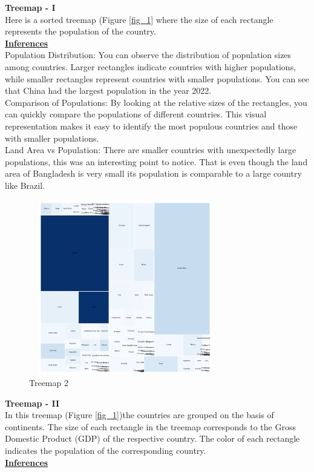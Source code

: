 \documentclass[conference]{IEEEtran}
\begin{document}
\textbf{Treemap - I}\\
Here is a sorted treemap (Figure \ref{fig_1} where the size of each rectangle represents the population of the country.\\
\underline{\textbf{Inferences}}\\
Population Distribution: You can observe the distribution of population sizes among countries. Larger rectangles indicate countries with higher populations, while smaller rectangles represent countries with smaller populations. You can see that China had the largest population in the year 2022.\\
Comparison of Populations: By looking at the relative sizes of the rectangles, you can quickly compare the populations of different countries. This visual representation makes it easy to identify the most populous countries and those with smaller populations.\\
Land Area vs Population: There are smaller countries with unexpectedly large populations, this was an interesting point to notice. That is even though the land area of Bangladesh is very small its population is comparable to a large country like Brazil.
\begin{figure}
\centering
    \includegraphics[height=3in, width=0.75\textwidth]{images_ashish/treemap2.png}
    \caption{Treemap 2}
    \label{fig_2}
\end{figure}
\textbf{Treemap - II}\\
In this treemap (Figure \ref{fig_1})the countries are grouped on the basis of continents. The size of each rectangle in the treemap corresponds to the Gross Domestic Product (GDP) of the respective country. The color of each rectangle indicates the population of the corresponding country. \\
\underline{\textbf{Inferences}}\\
\end{document}
